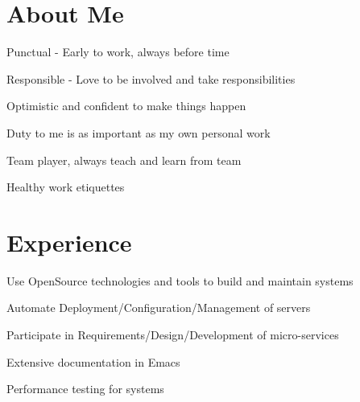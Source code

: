 \documentclass[letterpaper]{deedy-resume} %
\begin{document}
\hfill
%
%
\begin{minipage}[t]{0.66\textwidth} %

\section{About Me}
\sectionspace 
\begin{tightitemize}
\item Punctual - Early to work, always before time 
\item Responsible - Love to be involved and take responsibilities
\item Optimistic and confident to make things happen
\item Duty to me is as important as my own personal work
\item Team player, always teach and learn from team
\item Healthy work etiquettes
\end{tightitemize}

\sectionspace
\sectionspace %

\section{Experience}


\vspace{\topsep} %
\begin{tightitemize}
\item Use OpenSource technologies and tools to build and maintain systems
\item Automate Deployment/Configuration/Management of servers
\item Participate in Requirements/Design/Development of micro-services 
\item Extensive documentation in Emacs 
\item Performance testing for systems 
\end{tightitemize}


\end{minipage}
\end{document}
